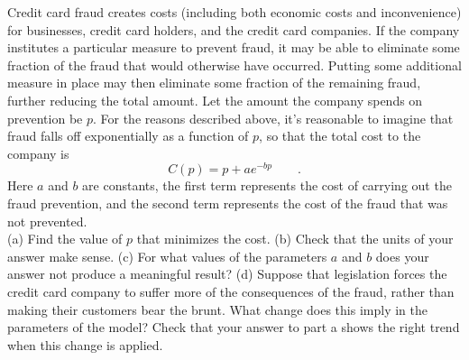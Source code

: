 Credit card fraud creates costs (including both economic costs and
inconvenience) for businesses, credit card holders, and the credit
card companies. If the company institutes a particular measure to
prevent fraud, it may be able to eliminate some fraction of the fraud
that would otherwise have occurred. Putting some additional measure in place
may then eliminate some fraction of the remaining fraud, further reducing
the total amount. Let the amount the company spends on prevention be $p$.
For the reasons described above, it's reasonable to imagine that fraud
falls off exponentially as a function of $p$, so that the total cost
to the company is
\begin{equation*}
  C(p) = p+ae^{-bp} \qquad .
\end{equation*}
Here $a$ and $b$ are constants, the first term represents the cost of
carrying out the fraud prevention, and the second term represents
the cost of the fraud that was not prevented.\\
(a) Find the value of $p$ that minimizes the cost.\answercheck\hwendpart
(b) Check that the units of your answer make sense.\hwendpart
(c) For what values of the parameters $a$ and
$b$ does your answer not produce a meaningful result? \hwendpart
(d) Suppose that legislation forces the credit card company to suffer
more of the consequences of the fraud, rather than making their customers
bear the brunt. What change does this imply in the parameters of the model?
Check that your answer to part a shows the right trend when this change
is applied.
